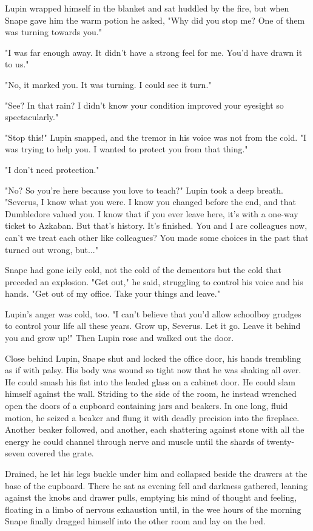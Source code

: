 \documentclass[a4paper,11pt]{article}
\begin{document}
Lupin wrapped himself in the blanket and sat huddled by the fire, but when Snape gave him the warm potion he asked, "Why did you stop me? One of them was turning towards you."

"I was far enough away. It didn't have a strong feel for me. You'd have drawn it to us."

"No, it marked you. It was turning. I could see it turn."

"See? In that rain? I didn't know your condition improved your eyesight so spectacularly."

"Stop this!" Lupin snapped, and the tremor in his voice was not from the cold. "I was trying to help you. I wanted to protect you from that thing."

"I don't need protection."

"No? So you're here because you love to teach?" Lupin took a deep breath. "Severus, I know what you were. I know you changed before the end, and that Dumbledore valued you. I know that if you ever leave here, it's with a one-way ticket to Azkaban. But that's history. It's finished. You and I are colleagues now, can't we treat each other like colleagues? You made some choices in the past that turned out wrong, but..."

Snape had gone icily cold, not the cold of the dementors but the cold that preceded an explosion. "Get out," he said, struggling to control his voice and his hands. "Get out of my office. Take your things and leave."

Lupin's anger was cold, too. "I can't believe that you'd allow schoolboy grudges to control your life all these years. Grow up, Severus. Let it go. Leave it behind you and grow up!" Then Lupin rose and walked out the door.

Close behind Lupin, Snape shut and locked the office door, his hands trembling as if with palsy. His body was wound so tight now that he was shaking all over. He could smash his fist into the leaded glass on a cabinet door. He could slam himself against the wall. Striding to the side of the room, he instead wrenched open the doors of a cupboard containing jars and beakers. In one long, fluid motion, he seized a beaker and flung it with deadly precision into the fireplace. Another beaker followed, and another, each shattering against stone with all the energy he could channel through nerve and muscle until the shards of twenty-seven covered the grate.

Drained, he let his legs buckle under him and collapsed beside the drawers at the base of the cupboard. There he sat as evening fell and darkness gathered, leaning against the knobs and drawer pulls, emptying his mind of thought and feeling, floating in a limbo of nervous exhaustion until, in the wee hours of the morning Snape finally dragged himself into the other room and lay on the bed.
\end{document}
